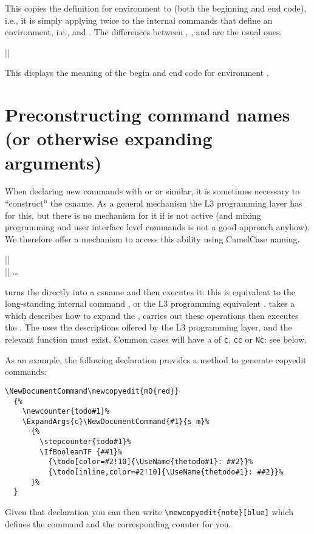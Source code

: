 \documentclass{ltxguide}
\begin{document}
This copies the definition for environment  to
 (both the beginning and end code), i.e., it is simply
applying  twice to the internal commands that
define an environment, i.e., \cs{} and .
The differences between , , and
 are the usual ones.

\begin{decl}
  |\ShowEnvironment|       
\end{decl}
This displays the meaning of the begin and end code for environment .




\section[Preconstructing command names \\ (or otherwise expanding arguments)]
        {Preconstructing command names (or otherwise expanding arguments)}
\label{sec:preconstructing-csnames}

When declaring new commands with  or
 or similar, it is sometimes necessary to
``construct'' the csname. As a general mechanism the L3 programming
layer has  for this, but there is no mechanism for
it if  is not active (and mixing programming and user
interface level commands is not a good approach anyhow). We therefore
offer a mechanism to access this ability using CamelCase naming.

\begin{decl}
  |\UseName|   \\
  |\ExpandArgs|    \dots
\end{decl}

 turns the  directly into a csname and
then executes it: this is equivalent to the long-standing
\LaTeXe{} internal command , or the L3 programming
equivalent .  takes a  which
describes how to expand the , carries out these
operations then executes the . The  uses
the descriptions offered by the L3 programming layer, and the
relevant  function must exist. Common cases will
have a  of \texttt{c}, \texttt{cc} or \texttt{Nc}: see below.

As an example, the following declaration provides a method to generate
copyedit commands:
\begin{verbatim}
\NewDocumentCommand\newcopyedit{mO{red}}
  {%
    \newcounter{todo#1}%
    \ExpandArgs{c}\NewDocumentCommand{#1}{s m}%
      {%
        \stepcounter{todo#1}%
        \IfBooleanTF {##1}%
          {\todo[color=#2!10]{\UseName{thetodo#1}: ##2}}%
          {\todo[inline,color=#2!10]{\UseName{thetodo#1}: ##2}}%
      }%
  }
\end{verbatim}
Given that declaration you can then write
\verb/\newcopyedit{note}[blue]/ which defines the command 
and the corresponding counter for you.
\end{document}
